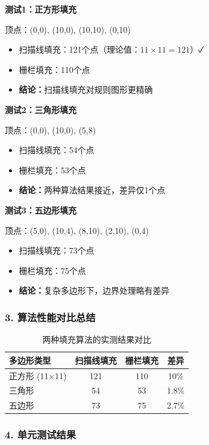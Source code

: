 ﻿\documentclass[12pt,a4paper]{article}
\begin{document}
\textbf{测试1：正方形填充}

顶点：(0,0), (10,0), (10,10), (0,10)
\begin{itemize}
\item 扫描线填充：121个点（理论值：$11 \times 11 = 121$）✓
\item 栅栏填充：110个点
\item \textbf{结论：}扫描线填充对规则图形更精确
\end{itemize}

\textbf{测试2：三角形填充}

顶点：(0,0), (10,0), (5,8)
\begin{itemize}
\item 扫描线填充：54个点
\item 栅栏填充：53个点
\item \textbf{结论：}两种算法结果接近，差异仅1个点
\end{itemize}

\textbf{测试3：五边形填充}

顶点：(5,0), (10,4), (8,10), (2,10), (0,4)
\begin{itemize}
\item 扫描线填充：73个点
\item 栅栏填充：75个点
\item \textbf{结论：}复杂多边形下，边界处理略有差异
\end{itemize}

\subsubsection{3. 算法性能对比总结}

\begin{table}[H]
\centering
\begin{tabular}{|l|c|c|c|}
\hline
\textbf{多边形类型} & \textbf{扫描线填充} & \textbf{栅栏填充} & \textbf{差异} \\
\hline
正方形 (11×11) & 121 & 110 & 10\% \\
\hline
三角形 & 54 & 53 & 1.8\% \\
\hline
五边形 & 73 & 75 & 2.7\% \\
\hline
\end{tabular}
\caption{两种填充算法的实测结果对比}
\end{table}

\subsubsection{4. 单元测试结果}
\end{document}
